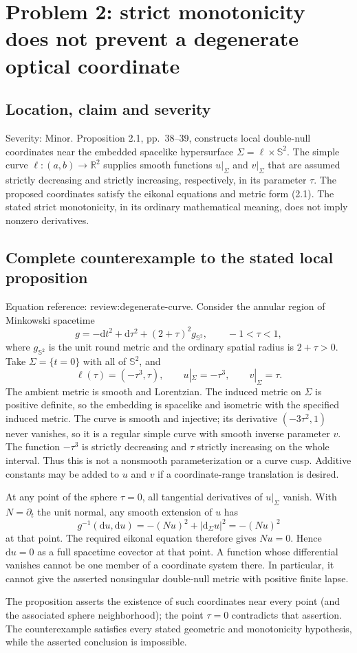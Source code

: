 \documentclass[10pt]{article}
\begin{document}
\section*{Problem 2: strict monotonicity does not prevent a degenerate optical coordinate}
\subsection*{Location, claim and severity}
Severity: Minor. Proposition 2.1, pp. 38–39, constructs local double-null coordinates near the embedded spacelike hypersurface \(\Sigma=\ell\times\mathbb S^2\). The simple curve \(\ell:(a,b)\to\mathbb R^2\) supplies smooth functions \(u|_\Sigma\) and \(v|_\Sigma\) that are assumed strictly decreasing and strictly increasing, respectively, in its parameter \(\tau\). The proposed coordinates satisfy the eikonal equations and metric form (2.1). The stated strict monotonicity, in its ordinary mathematical meaning, does not imply nonzero derivatives.\par
\subsection*{Complete counterexample to the stated local proposition}
Equation reference: review:degenerate-curve. Consider the annular region of Minkowski spacetime \[g=-\mathrm dt^2+\mathrm d\tau^2+(2+\tau)^2g_{\mathbb S^2},
 \qquad -1<\tau<1,\] where \(g_{\mathbb S^2}\) is the unit round metric and the ordinary spatial radius is \(2+\tau>0\). Take \(\Sigma=\{t=0\}\) with all of \(\mathbb S^2\), and \[
 \ell(\tau)=(-\tau^3,\tau),\qquad
 u|_\Sigma=-\tau^3,\qquad v|_\Sigma=\tau.\] The ambient metric is smooth and Lorentzian. The induced metric on \(\Sigma\) is positive definite, so the embedding is spacelike and isometric with the specified induced metric. The curve is smooth and injective; its derivative \((-3\tau^2,1)\) never vanishes, so it is a regular simple curve with smooth inverse parameter \(v\). The function \(-\tau^3\) is strictly decreasing and \(\tau\) strictly increasing on the whole interval. Thus this is not a nonsmooth parameterization or a curve cusp. Additive constants may be added to \(u\) and \(v\) if a coordinate-range translation is desired.\par
At any point of the sphere \(\tau=0\), all tangential derivatives of \(u|_\Sigma\) vanish. With \(N=\partial_t\) the unit normal, any smooth extension of \(u\) has \[g^{-1}(\mathrm du,\mathrm du)
       =-(Nu)^2+|\mathrm d_\Sigma u|^2
       =-(Nu)^2\] at that point. The required eikonal equation therefore gives \(Nu=0\). Hence \(\mathrm du=0\) as a full spacetime covector at that point. A function whose differential vanishes cannot be one member of a coordinate system there. In particular, it cannot give the asserted nonsingular double-null metric with positive finite lapse.\par
The proposition asserts the existence of such coordinates near every point (and the associated sphere neighborhood); the point \(\tau=0\) contradicts that assertion. The counterexample satisfies every stated geometric and monotonicity hypothesis, while the asserted conclusion is impossible.\par
\end{document}
